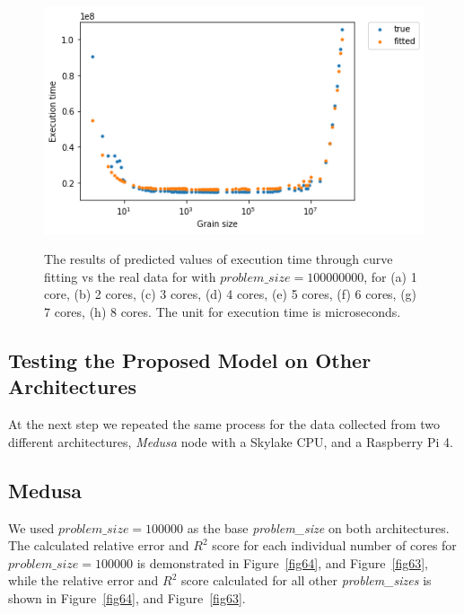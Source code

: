 \begin{figure}[H]
	{\centering\includegraphics[scale=.35]{images/hpx_for_loop/fitted/100000/marvin_100000000_7_100000.png}	
		\label{fig62:g}}
	\hfill
	\caption{The results of predicted values of execution time through curve fitting vs the real data for with $problem\_size=100000000$, for (a) 1 core, (b) 2 cores, (c) 3 cores, (d) 4 cores, (e) 5 cores, (f) 6 cores, (g) 7 cores, (h) 8 cores. The unit for execution time is microseconds.}
	\label{fig62}	
\end{figure}


\subsection{Testing the Proposed Model on Other Architectures}

At the next step we repeated the same process for the data collected from two different architectures, \textit{Medusa} node with a Skylake CPU, and a Raspberry Pi 4.

\subsection{Medusa}
We used $problem\_{size}=100000$ as the base \emph{problem\_{size}} on both architectures. The calculated relative error and $R^2$ score for each individual number of cores for $problem\_{size}=100000$ is demonstrated in Figure~\ref{fig64}, and Figure~\ref{fig63}, while the relative error and $R^2$ score calculated for all other \emph{problem\_{sizes}} is shown in Figure~\ref{fig64}, and Figure~\ref{fig63}.


